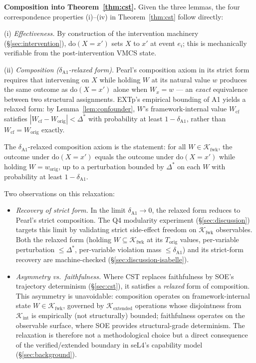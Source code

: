 \documentclass[conference]{IEEEtran}
\newcommand{\Korig}{T_\text{orig}}
\newcommand{\Kextended}{\mathcal{K}_\text{extended}}
\newcommand{\Kint}{\mathcal{K}_\text{int}}
\newcommand{\Kfwk}{\mathcal{K}_\text{fwk}}
\newcommand{\Dstar}{\Delta^{*}}
\newcommand{\dox}[1]{\text{do}(X{=}#1)}
\begin{document}
\textbf{Composition into Theorem~\ref{thm:cst}.} Given the three
lemmas, the four correspondence properties (i)--(iv) in
Theorem~\ref{thm:cst} follow directly:

(i) \emph{Effectiveness.} By construction of the intervention
machinery (\S\ref{sec:intervention}), $\dox{x'}$ sets $X$ to
$x'$ at event $e_i$; this is mechanically verifiable from the
post-intervention VMCS state.

(ii) \emph{Composition ($\delta_{\text{A1}}$-relaxed form).}
Pearl's composition axiom in its strict form requires that
intervening on $X$ while holding $W$ at its natural value $w$
produces the same outcome as $\dox{x'}$ alone when $W_x = w$ ---
an \emph{exact} equivalence between two structural assignments.
EXTp's empirical bounding of A1 yields a relaxed form: by
Lemma~\ref{lem:confounder}, $W$'s framework-internal value
$W_{\text{cf}}$ satisfies $|W_{\text{cf}} - W_{\text{orig}}| <
\Dstar$ with probability at least $1 - \delta_{\text{A1}}$, rather
than $W_{\text{cf}} = W_{\text{orig}}$ exactly.

The $\delta_{\text{A1}}$-relaxed composition axiom is the
statement: for all $W \in \Kfwk$, the outcome under $\dox{x'}$
equals the outcome under $\dox{x'}$ while holding
$W = w_{\text{orig}}$, up to a perturbation bounded by $\Dstar$
on each $W$ with probability at least $1 - \delta_{\text{A1}}$.

Two observations on this relaxation:
\begin{itemize}[leftmargin=*]
  \item \emph{Recovery of strict form.} In the limit
    $\delta_{\text{A1}} \to 0$, the relaxed form reduces to
    Pearl's strict composition. The Q4 modularity experiment
    (\S\ref{sec:discussion}) targets this limit by validating
    strict side-effect freedom on $\Kfwk$ observables. Both the
    relaxed form (holding $W \subseteq \Kfwk$ at its $\Korig$
    values, per-variable perturbation $\leq \Dstar$, per-variable
    violation mass $\leq \delta_{\text{A1}}$) and its strict-form
    recovery are machine-checked (\S\ref{sec:discussion-isabelle}).
  \item \emph{Asymmetry vs.\ faithfulness.} Where CST replaces
    faithfulness by SOE's trajectory determinism (\S\ref{sec:cst}),
    it satisfies a \emph{relaxed} form of composition. This asymmetry is
    unavoidable: composition operates on framework-internal state
    $W \in \Kfwk$, governed by $\Kextended$ operations whose
    disjointness from $\Kint$ is empirically (not structurally)
    bounded; faithfulness operates on the observable surface,
    where SOE provides structural-grade determinism. The
    relaxation is therefore not a methodological choice but a
    direct consequence of the verified/extended boundary in
    seL4's capability model (\S\ref{sec:background}).
\end{itemize}
\end{document}
